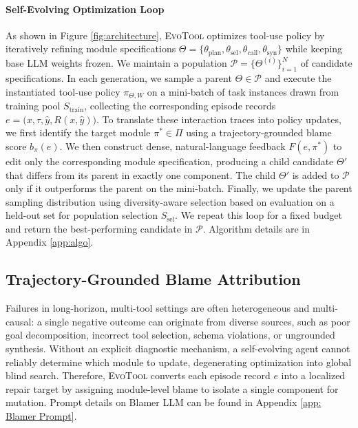 \documentclass[11pt]{article}
\begin{document}
\paragraph{Self-Evolving Optimization Loop}


As shown in Figure \ref{fig:architecture}, \textcolor{black}{\textsc{EvoTool}} optimizes tool-use policy by iteratively refining module specifications $\Theta=\{\theta_{\text{plan}},\theta_{\text{sel}},\theta_{\text{call}},\theta_{\text{syn}}\}$ while keeping base LLM weights frozen. We maintain a population $\mathcal{P}=\{\Theta^{(i)}\}_{i=1}^{N}$ of candidate specifications. In each generation, we sample a parent $\Theta\in\mathcal{P}$ and execute the instantiated tool-use policy $\pi_{\Theta,W}$ on a mini-batch of task instances drawn from training pool $S_{\text{train}}$, collecting the corresponding episode records $e=\big(x,\tau,\hat{y},R(x,\hat{y})\big)$. To translate these interaction traces into policy updates, we first identify the target module $\pi^{\ast}\in\Pi$ using a trajectory-grounded blame score $b_{\pi}(e)$. We then construct dense, natural-language feedback $F(e,\pi^{\ast})$ to edit only the corresponding module specification, producing a child candidate $\Theta'$ that differs from its parent in exactly one component. The child $\Theta'$ is added to $\mathcal{P}$ only if it outperforms the parent on the mini-batch. Finally, we update the parent sampling distribution using diversity-aware selection based on evaluation on a held-out set for population selection $S_{\text{sel}}$. We repeat this loop for a fixed budget and return the best-performing candidate in $\mathcal{P}$. Algorithm details are in Appendix \ref{app:algo}.




\subsection{Trajectory-Grounded Blame Attribution}
\label{sec: blame attribution}

Failures in long-horizon, multi-tool settings are often heterogeneous and multi-causal: a single negative outcome can originate from diverse sources, such as poor goal decomposition, incorrect tool selection, schema violations, or ungrounded synthesis. Without an explicit diagnostic mechanism, a self-evolving agent cannot reliably determine which module to update, degenerating optimization into
global blind search. Therefore, \textcolor{black}{\textsc{EvoTool}} converts each episode record $e$ into a localized repair target by assigning module-level blame to isolate a single component for mutation. Prompt details on Blamer LLM can be found in Appendix \ref{app: Blamer Prompt}.
\end{document}
